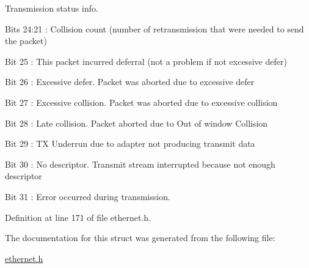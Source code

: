 Transmission status info. 


\begin{DoxyItemize}
\item Bits 24\-:21 \-: Collision count (number of retransmission that were needed to send the packet)
\item Bit 25 \-: This packet incurred deferral (not a problem if not excessive defer)
\item Bit 26 \-: Excessive defer. Packet was aborted due to excessive defer
\item Bit 27 \-: Excessive collision. Packet was aborted due to excessive collision
\item Bit 28 \-: Late collision. Packet aborted due to Out of window Collision
\item Bit 29 \-: T\-X Underrun due to adapter not producing transmit data
\item Bit 30 \-: No descriptor. Transmit stream interrupted because not enough descriptor
\item Bit 31 \-: Error occurred during transmission. 
\end{DoxyItemize}

Definition at line 171 of file ethernet.\-h.



The documentation for this struct was generated from the following file\-:\begin{DoxyCompactItemize}
\item 
\hyperlink{ethernet_8h}{ethernet.\-h}\end{DoxyCompactItemize}
